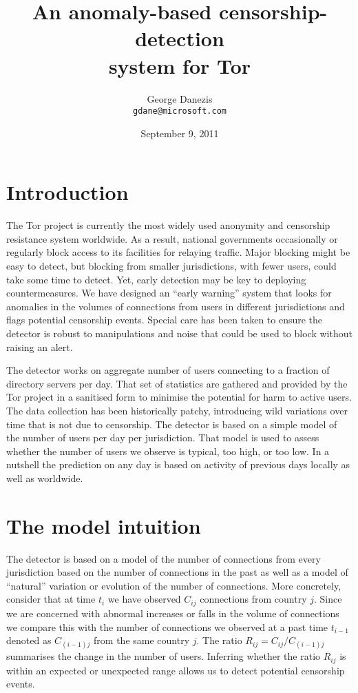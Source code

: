 \documentclass{article}
\begin{document}
\author{George Danezis\\{\tt gdane@microsoft.com}}
\title{An anomaly-based censorship-detection\\system for Tor}
\date{September 9, 2011}
\maketitle

\section{Introduction}

The Tor project is currently the most widely used anonymity and censorship
resistance system worldwide.
As a result, national governments occasionally or regularly block access
to its facilities for relaying traffic.
Major blocking might be easy to detect, but blocking from smaller
jurisdictions, with fewer users, could take some time to detect.
Yet, early detection may be key to deploying countermeasures.
We have designed an ``early warning'' system that looks for anomalies in
the volumes of connections from users in different jurisdictions and flags
potential censorship events.
Special care has been taken to ensure the detector is robust to
manipulations and noise that could be used to block without raising an
alert.

The detector works on aggregate number of users connecting to a fraction
of directory servers per day.
That set of statistics are gathered and provided by the Tor project in a
sanitised form to minimise the potential for harm to active users.
The data collection has been historically patchy, introducing wild
variations over time that is not due to censorship.
The detector is based on a simple model of the number of users per day per
jurisdiction.
That model is used to assess whether the number of users we observe is
typical, too high, or too low.
In a nutshell the prediction on any day is based on activity of previous
days locally as well as worldwide.

\section{The model intuition}

The detector is based on a model of the number of connections from every
jurisdiction based on the number of connections in the past as well as a
model of ``natural'' variation or evolution of the number of connections.
More concretely, consider that at time $t_i$ we have observed $C_{ij}$
connections from country $j$.
Since we are concerned with abnormal increases or falls in the volume of
connections we compare this with the number of connections we observed at
a past time $t_{i-1}$ denoted as $C_{(i-1)j}$ from the same country $j$.
The ratio $R_{ij} = C_{ij} / C_{(i-1)j}$ summarises the change in the
number of users.
Inferring whether the ratio $R_{ij}$ is within an expected or unexpected
range allows us to detect potential censorship events. 
\end{document}
